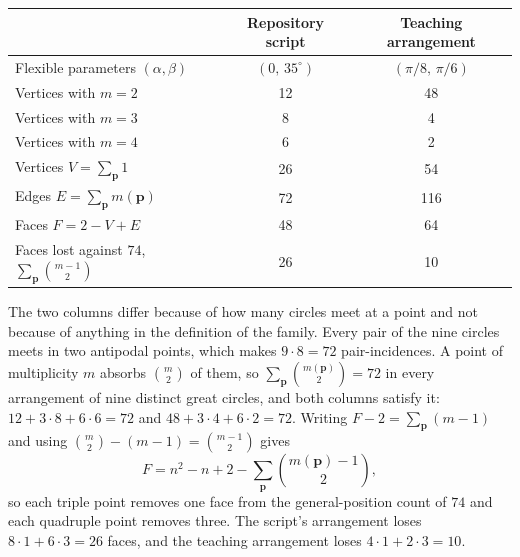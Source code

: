 \begin{center}
\begin{tabular}{@{}lcc@{}}
\toprule
 & Repository script & Teaching arrangement\\
\midrule
Flexible parameters $(\alpha,\beta)$ & $(0,\,35^\circ)$ & $(\pi/8,\,\pi/6)$\\
Vertices with $m=2$ & 12 & 48\\
Vertices with $m=3$ & 8 & 4\\
Vertices with $m=4$ & 6 & 2\\
Vertices $V=\sum_{\mathbf p}1$ & 26 & 54\\
Edges $E=\sum_{\mathbf p}m(\mathbf p)$ & 72 & 116\\
Faces $F=2-V+E$ & 48 & 64\\
Faces lost against $74$, $\sum_{\mathbf p}\binom{m-1}{2}$ & 26 & 10\\
\bottomrule
\end{tabular}
\end{center}

The two columns differ because of how many circles meet at a point and not because of anything in the definition of the family. Every pair of the nine circles meets in two antipodal points, which makes $9\cdot8=72$ pair-incidences. A point of multiplicity $m$ absorbs $\binom m2$ of them, so $\sum_{\mathbf p}\binom{m(\mathbf p)}{2}=72$ in every arrangement of nine distinct great circles, and both columns satisfy it: $12+3\cdot8+6\cdot6=72$ and $48+3\cdot4+6\cdot2=72$. Writing $F-2=\sum_{\mathbf p}(m-1)$ and using $\binom m2-(m-1)=\binom{m-1}{2}$ gives
\[
  F=n^2-n+2-\sum_{\mathbf p}\binom{m(\mathbf p)-1}{2},
\]
so each triple point removes one face from the general-position count of $74$ and each quadruple point removes three. The script's arrangement loses $8\cdot1+6\cdot3=26$ faces, and the teaching arrangement loses $4\cdot1+2\cdot3=10$.

